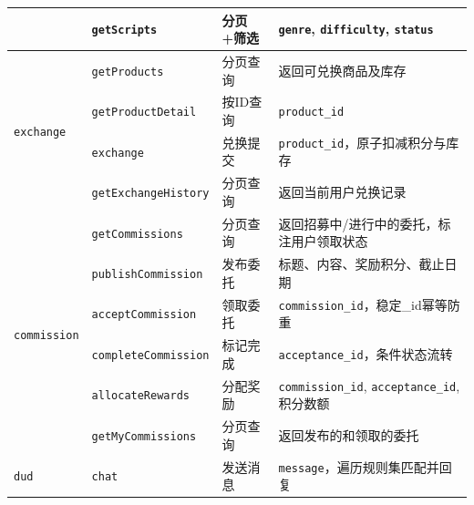 \documentclass[a4paper,12pt]{article}
\begin{document}
\begin{table}[H]
{\begin{tabular}{p{2.4cm} p{3.6cm} p{2.6cm} p{5.2cm}}
                                               & \texttt{getScripts}         & 分页+筛选         & \texttt{genre}, \texttt{difficulty}, \texttt{status}                \\
      \midrule
      \multirow{4}{*}{\texttt{exchange}}       & \texttt{getProducts}        & 分页查询          & 返回可兑换商品及库存                                                          \\
                                               & \texttt{getProductDetail}   & 按ID查询         & \texttt{product\_id}                                                \\
                                               & \texttt{exchange}           & 兑换提交          & \texttt{product\_id}，原子扣减积分与库存                                      \\
                                               & \texttt{getExchangeHistory} & 分页查询          & 返回当前用户兑换记录                                                          \\
      \midrule
      \multirow{6}{*}{\texttt{commission}}     & \texttt{getCommissions}     & 分页查询          & 返回招募中/进行中的委托，标注用户领取状态                                               \\
                                               & \texttt{publishCommission}  & 发布委托          & 标题、内容、奖励积分、截止日期                                                     \\
                                               & \texttt{acceptCommission}   & 领取委托          & \texttt{commission\_id}，稳定\_id幂等防重                                  \\
                                               & \texttt{completeCommission} & 标记完成          & \texttt{acceptance\_id}，条件状态流转                                      \\
                                               & \texttt{allocateRewards}    & 分配奖励          & \texttt{commission\_id}, \texttt{acceptance\_id}, 积分数额              \\
                                               & \texttt{getMyCommissions}   & 分页查询          & 返回发布的和领取的委托                                                         \\
      \midrule
      \multirow{2}{*}{\texttt{dud}}            & \texttt{chat}               & 发送消息          & \texttt{message}，遍历规则集匹配并回复                                         \\

\end{tabular}}
\end{table}
\end{document}
